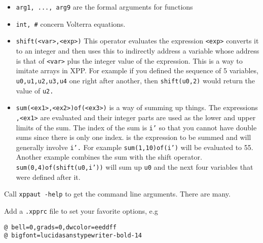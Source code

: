 \begin{itemize}
\item {\tt arg1, ..., arg9} are the formal arguments for functions 
\item {\tt int, \#} concern Volterra equations.
\item {\tt shift(<var>,<exp>)} This operator evaluates the expression
{\tt <exp>} converts it to an integer and then uses this to indirectly
address a variable whose address is that of {\tt <var>} plus the
integer value of the expression.  This is a way to imitate arrays in
XPP.  For example if you defined the sequence of 5 variables, {\tt
u0,u1,u2,u3,u4} one right after another, then {\tt shift(u0,2)} would
return the value of {\tt u2.} 
\item {\tt sum(<ex1>,<ex2>)of(<ex3>)} is a way of summing up things.
The expressions {\tt <ex1>,<ex1>} are evaluated and their integer
parts are used as the lower and upper limits of the sum.  The index of
the sum is {\tt i'} so that you cannot have double sums since there is
only one index.  {\tt <ex3>} is the expression to be summed and will
generally involve {\tt i'.}  For example  {\tt sum(1,10)of(i')} will
be evaluated to 55.  Another example combines the sum with the shift
operator.  {\tt sum(0,4)of(shift(u0,i'))} will sum up {\tt u0} and the
next four variables that were defined after it.  
\end{itemize}


\medskip
\noindent Call {\tt xppaut -help} to get the command line arguments. There are many.

\medskip
\noindent Add a {\tt .xpprc} file to set your favorite options, e.g
\begin{verbatim}
@ bell=0,grads=0,dwcolor=eeddff
@ bigfont=lucidasanstypewriter-bold-14
\end{verbatim}












